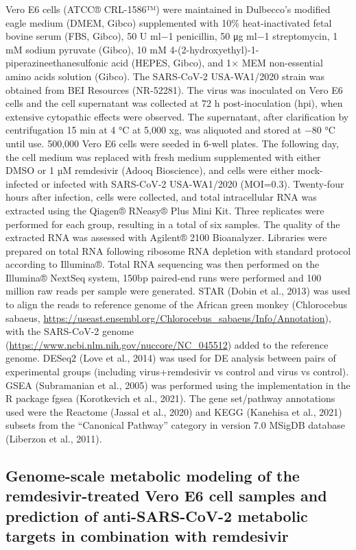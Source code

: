 \documentclass[12pt,twoside,openany,\mydriver]{thesis}  %
\begin{document}
Vero E6 cells (ATCC® CRL-1586™) were maintained in Dulbecco's modified eagle medium (DMEM, Gibco) supplemented with 10\% heat-inactivated fetal bovine serum (FBS, Gibco), 50 U ml−1 penicillin, 50 μg ml−1 streptomycin, 1 mM sodium pyruvate (Gibco), 10 mM 4-(2-hydroxyethyl)-1-piperazineethanesulfonic acid (HEPES, Gibco), and 1× MEM non-essential amino acids solution (Gibco). The SARS-CoV-2 USA-WA1/2020 strain was obtained from BEI Resources (NR-52281). The virus was inoculated on Vero E6 cells and the cell supernatant was collected at 72 h post-inoculation (hpi), when extensive cytopathic effects were observed. The supernatant, after clarification by centrifugation 15 min at 4 °C at 5,000 xg, was aliquoted and stored at −80 °C until use. 500,000 Vero E6 cells were seeded in 6-well plates. The following day, the cell medium was replaced with fresh medium supplemented with either DMSO or 1 µM remdesivir (Adooq Bioscience), and cells were either mock-infected or infected with SARS-CoV-2 USA-WA1/2020 (MOI=0.3). Twenty-four hours after infection, cells were collected, and total intracellular RNA was extracted using the Qiagen® RNeasy® Plus Mini Kit. Three replicates were performed for each group, resulting in a total of six samples. The quality of the extracted RNA was assessed with Agilent® 2100 Bioanalyzer. Libraries were prepared on total RNA following ribosome RNA depletion with standard protocol according to Illumina®. Total RNA sequencing was then performed on the Illumina® NextSeq system, 150bp paired-end runs were performed and 100 million raw reads per sample were generated. STAR (Dobin et al., 2013) was used to align the reads to reference genome of the African green monkey (Chlorocebus sabaeus, \url{https://useast.ensembl.org/Chlorocebus_sabaeus/Info/Annotation}), with the SARS-CoV-2 genome (\url{https://www.ncbi.nlm.nih.gov/nuccore/NC_045512}) added to the reference genome. DESeq2 (Love et al., 2014) was used for DE analysis between pairs of experimental groups (including virus+remdesivir vs control and virus vs control). GSEA (Subramanian et al., 2005) was performed using the implementation in the R package fgsea (Korotkevich et al., 2021). The gene set/pathway annotations used were the Reactome (Jassal et al., 2020) and KEGG (Kanehisa et al., 2021) subsets from the ``Canonical Pathway'' category in version 7.0 MSigDB database (Liberzon et al., 2011).

\hypertarget{genome-scale-metabolic-modeling-of-the-remdesivir-treated-vero-e6-cell-samples-and-prediction-of-anti-sars-cov-2-metabolic-targets-in-combination-with-remdesivir}{%
\subsection{Genome-scale metabolic modeling of the remdesivir-treated Vero E6 cell samples and prediction of anti-SARS-CoV-2 metabolic targets in combination with remdesivir}\label{genome-scale-metabolic-modeling-of-the-remdesivir-treated-vero-e6-cell-samples-and-prediction-of-anti-sars-cov-2-metabolic-targets-in-combination-with-remdesivir}}
\end{document}
